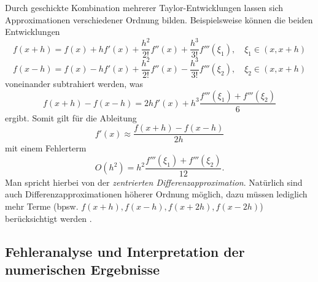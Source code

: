 Durch geschickte Kombination mehrerer Taylor-Entwicklungen lassen sich Approximationen verschiedener Ordnung bilden. 
Beispielsweise können die beiden Entwicklungen
\begin{equation*}
	f\left(x+h\right) = f\left(x\right) + h f'\left(x\right) + \frac{h^2}{2!}f''\left(x\right) + \frac{h^3}{3!}f'''\left(\xi_1\right), \quad\xi_1 \in \left(x , x + h\right)
\end{equation*}
\begin{equation*}
	f(x-h) = f(x) - h f'\left(x\right) + \frac{h^2}{2!}f''\left(x\right) - \frac{h^3}{3!}f'''\left(\xi_2\right), \quad\xi_2 \in \left(x , x + h\right)
\end{equation*}
voneinander subtrahiert werden, was
\begin{equation*}
	f\left(x+h\right) - f\left(x-h\right) =  2h f'\left(x\right) + h^3 \frac{f'''\left(\xi_1\right) + f'''\left(\xi_2\right)}{6}
\end{equation*}
ergibt.
Somit gilt für die Ableitung 
\begin{equation*}
	f'\left(x\right) \approx \frac{f\left(x + h\right) - f\left(x-h\right)}{2h}
\end{equation*}
mit einem Fehlerterm
\begin{equation*}
	O(h^2) = h^2\frac{f'''\left(\xi_1\right) + f'''\left(\xi_2\right)}{12}.
\end{equation*}
Man spricht hierbei von der \emph{zentrierten Differenzapproximation}. 
%
%
Natürlich sind auch Differenzapproximationen höherer Ordnung möglich, dazu müssen lediglich mehr Terme (bpsw. $f\left(x + h\right), f\left(x - h\right), f\left(x + 2h\right), f\left(x - 2h\right)$) berücksichtigt werden \cite{step:fornberg1998}. 


\subsection{Fehleranalyse und Interpretation der numerischen Ergebnisse}

